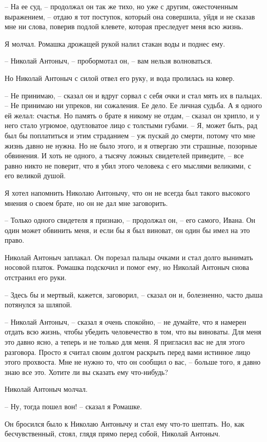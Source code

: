 \documentclass{bmstu}
\begin{document}
– На ее суд, – продолжал он так же тихо, но уже с другим, ожесточенным
выражением, – отдаю я тот поступок, который она совершила, уйдя и не сказав мне
ни слова, поверив подлой клевете, которая преследует меня всю жизнь.

Я молчал. Ромашка дрожащей рукой налил стакан воды и поднес ему.

– Николай Антоныч, – пробормотал он, – вам нельзя волноваться.

Но Николай Антоныч с силой отвел его руку, и вода пролилась на ковер.

– Не принимаю, – сказал он и вдруг сорвал с себя очки и стал мять их в пальцах.
– Не принимаю ни упреков, ни сожаления. Ее дело. Ее личная судьба. А я одного ей
желал: счастья. Но память о брате я никому не отдам, – сказал он хрипло, и у
него стало угрюмое, одутловатое лицо с толстыми губами. – Я, может быть, рад был
бы поплатиться и этим страданием – уж пускай до смерти, потому что мне жизнь
давно не нужна. Но не было этого, и я отвергаю эти страшные, позорные обвинения.
И хоть не одного, а тысячу ложных свидетелей приведите, – все равно никто не
поверит, что я убил этого человека с его мыслями великими, с его великой душой.

Я хотел напомнить Николаю Антонычу, что он не всегда был такого высокого мнения
о своем брате, но он не дал мне заговорить.

– Только одного свидетеля я признаю, – продолжал он, – его самого, Ивана. Он
один может обвинить меня, и если бы я был виноват, он один бы имел на это право.

Николай Антоныч заплакал. Он порезал пальцы очками и стал долго вынимать носовой
платок. Ромашка подскочил и помог ему, но Николай Антоныч снова отстранил его
руки.

– Здесь бы и мертвый, кажется, заговорил, – сказал он и, болезненно, часто дыша
потянулся за шляпой.

– Николай Антоныч, – сказал я очень спокойно, – не думайте, что я намерен отдать
всю жизнь, чтобы убедить человечество в том, что вы виноваты. Для меня это давно
ясно, а теперь и не только для меня. Я пригласил вас не для этого разговора.
Просто я считал своим долгом раскрыть перед вами истинное лицо этого прохвоста.
Мне не нужно то, что он сообщил о вас, – больше того, я давно знаю все это.
Хотите ли вы сказать ему что-нибудь?

Николай Антоныч молчал.

– Ну, тогда пошел вон! – сказал я Ромашке.

Он бросился было к Николаю Антонычу и стал ему что-то шептать. Но, как
бесчувственный, стоял, глядя прямо перед собой, Николай Антоныч.
\end{document}
